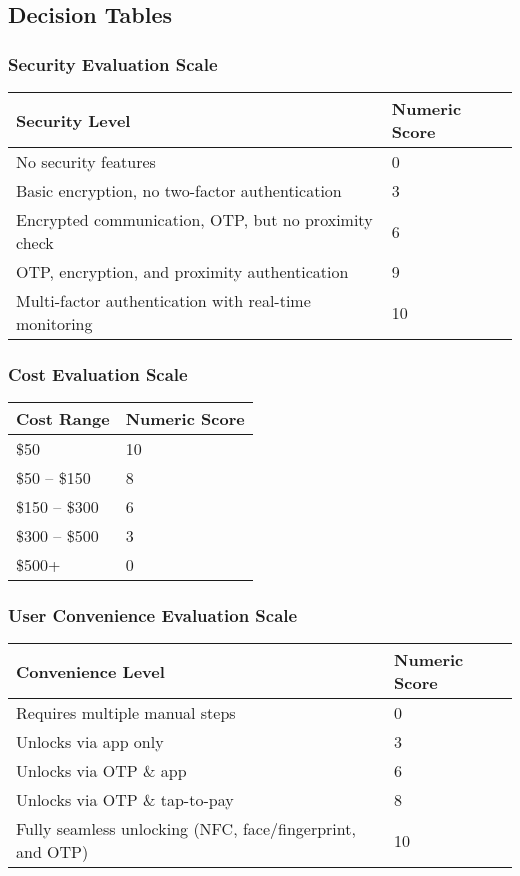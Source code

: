 \subsection{Decision Tables}

\subsubsection{Security Evaluation Scale}
\begin{tabular}{ll}
    \toprule
    Security Level & Numeric Score \\
    \midrule
    No security features & 0 \\
    Basic encryption, no two-factor authentication & 3 \\
    Encrypted communication, OTP, but no proximity check & 6 \\
    OTP, encryption, and proximity authentication & 9 \\
    Multi-factor authentication with real-time monitoring & 10 \\
    \bottomrule
\end{tabular}

\subsubsection{Cost Evaluation Scale}
\begin{tabular}{ll}
    \toprule
    Cost Range & Numeric Score \\
    \midrule
    \$50 & 10 \\
    \$50 – \$150 & 8 \\
    \$150 – \$300 & 6 \\
    \$300 – \$500 & 3 \\
    \$500+ & 0 \\
    \bottomrule
\end{tabular}

\subsubsection{User Convenience Evaluation Scale}
\begin{tabular}{ll}
    \toprule
    Convenience Level & Numeric Score \\
    \midrule
    Requires multiple manual steps & 0 \\
    Unlocks via app only & 3 \\
    Unlocks via OTP \& app & 6 \\
    Unlocks via OTP \& tap-to-pay & 8 \\
    Fully seamless unlocking (NFC, face/fingerprint, and OTP) & 10 \\
    \bottomrule
\end{tabular}

